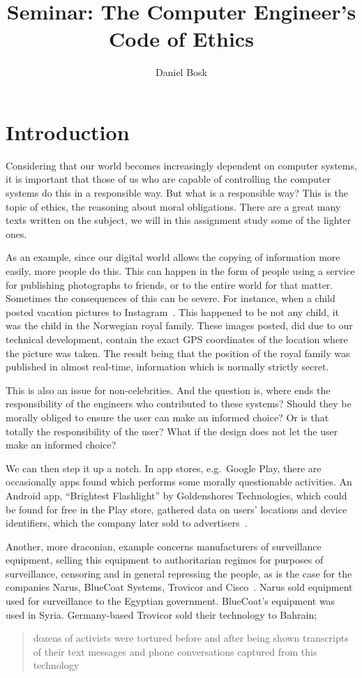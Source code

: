 \documentclass[a4paper]{article}
\title{Seminar: The Computer Engineer's Code of Ethics}
\author{%
  Daniel Bosk
}
\institute{%
  Department of Information and Communication Systems\\
  Mid Sweden University, Sundsvall
}
\begin{document}
\maketitle


\section{Introduction}

Considering that our world becomes increasingly dependent on computer systems, 
it is important that those of us who are capable of controlling the computer 
systems do this in a responsible way.
But what is a responsible way?
This is the topic of ethics, the reasoning about moral obligations.
There are a great many texts written on the subject, we will in this assignment 
study some of the lighter ones.

As an example, since our digital world allows the copying of information more 
easily, more people do this.
This can happen in the form of people using a service for publishing 
photographs to friends, or to the entire world for that matter.
Sometimes the consequences of this can be severe.
For instance, when a child posted vacation pictures to 
Instagram~\cite{Roberts2012wia}.
This happened to be not any child, it was the child in the Norwegian royal 
family.
These images posted, did due to our technical development, contain the exact 
GPS coordinates of the location where the picture was taken.
The result being that the position of the royal family was published in almost 
real-time, information which is normally strictly secret.

This is also an issue for non-celebrities.
And the question is, where ends the responsibility of the engineers who 
contributed to these systems?
Should they be morally obliged to ensure the user can make an informed choice?
Or is that totally the responsibility of the user?
What if the design does not let the user make an informed choice?

We can then step it up a notch.
In app stores, e.g.\ Google Play, there are occasionally apps found which 
performs some morally questionable activities.
An Android app, ``Brightest Flashlight'' by Goldenshores Technologies, which 
could be found for free in the Play store, gathered data on users' locations 
and device identifiers, which the company later sold to 
advertisers~\cite{garber2014roundup}.

Another, more draconian, example concerns manufacturers of surveillance 
equipment, selling this equipment to authoritarian regimes for purposes of 
surveillance, censoring and in general repressing the people, as is the case 
for the companies Narus, BlueCoat Systems, Trovicor and 
Cisco~\cite{effsurveil}.
Narus sold equipment used for surveillance to the Egyptian government.
BlueCoat's equipment was used in Syria.
Germany-based Trovicor sold their technology to Bahrain; 
\blockcquote{effsurveil}{dozens of activists were tortured before and after 
  being shown transcripts of their text messages and phone conversations 
  captured from this technology}.
\end{document}
